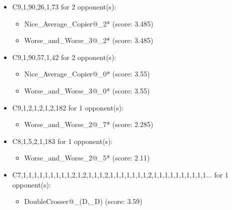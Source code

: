\begin{appendices}
\begin{itemize}
    \item C9,1,90,26,1,73 for 2 opponent(s):
    \begin{multicols}{3}
         \begin{itemize}
            \item Nice\_Average\_Copier@\_2* (score: 3.485)
            \item Worse\_and\_Worse\_3@\_2* (score: 3.485)
        \end{itemize}
     \end{multicols}
     
    \item C9,1,90,57,1,42 for 2 opponent(s):
    \begin{multicols}{3}
         \begin{itemize}
            \item Nice\_Average\_Copier@\_0* (score: 3.55)
            \item Worse\_and\_Worse\_3@\_0* (score: 3.55)
        \end{itemize}
     \end{multicols}
     
    \item C9,1,2,1,2,1,2,182 for 1 opponent(s):
    \begin{multicols}{3}
         \begin{itemize}
            \item Worse\_and\_Worse\_2@\_7* (score: 2.285)
        \end{itemize}
     \end{multicols}
     
    \item C8,1,5,2,1,183 for 1 opponent(s):
    \begin{multicols}{3}
         \begin{itemize}
            \item Worse\_and\_Worse\_2@\_5* (score: 2.11)
        \end{itemize}
     \end{multicols}
     
    \item C7,1,1,1,1,1,1,1,1,1,2,1,2,1,1,1,2,1,1,1,1,1,1,1,2,1,1,1,1,1,1,1,1,1,1... for 1 opponent(s):
    \begin{multicols}{3}
         \begin{itemize}
            \item DoubleCrosser@\_(D,\_D) (score: 3.59)
        \end{itemize}
     \end{multicols}
     

\end{itemize}
\end{appendices}
